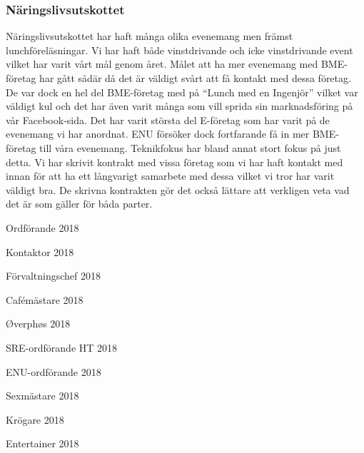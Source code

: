 \documentclass[../_main/handlingar.tex]{subfiles}
\begin{document}
\subsubsection*{Näringslivsutskottet}
Näringslivsutskottet har haft många olika evenemang men främst lunchföreläsningar. Vi har haft både vinstdrivande och icke vinstdrivande event vilket har varit vårt mål genom året. 
Målet att ha mer evenemang med BME-företag har gått sådär då det är väldigt svårt att få kontakt med dessa företag. De var dock en hel del BME-företag med på ``Lunch med en Ingenjör'' vilket var väldigt kul och det har även varit många som vill sprida sin marknadsföring på vår Facebook-sida.
Det har varit största del E-företag som har varit på de evenemang vi har anordnat. ENU försöker dock fortfarande få in mer BME-företag till våra evenemang. Teknikfokus har bland annat stort fokus på just detta.
Vi har skrivit kontrakt med vissa företag som vi har haft kontakt med innan för att ha ett långvarigt samarbete med dessa vilket vi tror har varit väldigt bra. De skrivna kontrakten gör det också lättare att verkligen veta vad det är som gäller för båda parter. 

\newpage
\begin{signatures}{10}
    \mvh
    \signature{Daniel Bakic}{Ordförande 2018}
    \signature{Axel Voss}{Kontaktor 2018}
    \signature{Magnus Lundh}{Förvaltningschef 2018}
    \signature{Elin Johansson}{Cafémästare 2018}
    \signature{Andreas Bennström}{Øverphøs 2018}
    \signature{Fanny Månefjord}{SRE-ordförande HT 2018}
    \signature{Isabella Hansen}{ENU-ordförande 2018}
    \signature{Alexander Wik}{Sexmästare 2018}
    \signature{Malin Heyden}{Krögare 2018}
    \signature{Adam Belfrage}{Entertainer 2018}
\end{signatures}
\end{document}
